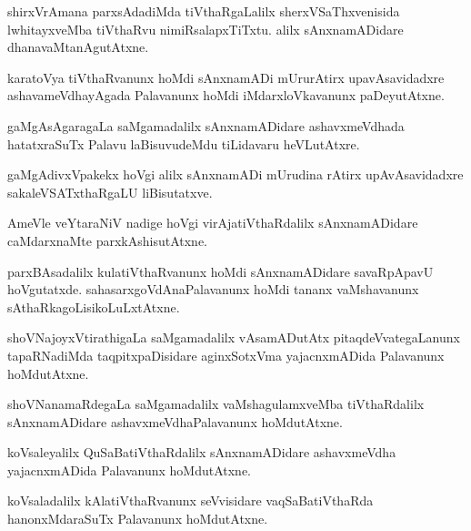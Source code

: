 \documentclass{article}
\begin{document}
\begin{mn}
shirxVrAmana parxsAdadiMda tiVthaRgaLalilx sherxVSaThxvenisida lwhitayxveMba tiVthaRvu 
nimiRsalapxTiTxtu. alilx sAnxnamADidare dhanavaMtanAgutAtxne.
\end{mn}

\begin{mn}
karatoVya tiVthaRvanunx hoMdi sAnxnamADi mUrurAtirx upavAsavidadxre ashavameVdhayAgada Palavanunx 
hoMdi iMdarxloVkavanunx paDeyutAtxne.
\end{mn}

\begin{mn}
gaMgAsAgaragaLa saMgamadalilx sAnxnamADidare ashavxmeVdhada hatatxraSuTx Palavu laBisuvudeMdu 
tiLidavaru heVLutAtxre.
\end{mn}

\begin{mn}
gaMgAdivxVpakekx hoVgi alilx sAnxnamADi mUrudina rAtirx upAvAsavidadxre sakaleVSATxthaRgaLU 
liBisutatxve.
\end{mn}

\begin{mn}
AmeVle veYtaraNiV nadige hoVgi virAjatiVthaRdalilx sAnxnamADidare caMdarxnaMte parxkAshisutAtxne.
\end{mn}

\begin{mn}
parxBAsadalilx kulatiVthaRvanunx hoMdi sAnxnamADidare savaRpApavU hoVgutatxde. 
sahasarxgoVdAnaPalavanunx hoMdi tananx vaMshavanunx sAthaRkagoLisikoLuLxtAtxne.
\end{mn}

\begin{mn}
shoVNajoyxVtirathigaLa saMgamadalilx vAsamADutAtx pitaqdeVvategaLanunx tapaRNadiMda 
taqpitxpaDisidare aginxSotxVma yajacnxmADida Palavanunx hoMdutAtxne.
\end{mn}

\begin{mn}
shoVNanamaRdegaLa saMgamadalilx vaMshagulamxveMba tiVthaRdalilx sAnxnamADidare 
ashavxmeVdhaPalavanunx hoMdutAtxne.
\end{mn}

\begin{mn}
koVsaleyalilx QuSaBatiVthaRdalilx sAnxnamADidare ashavxmeVdha yajacnxmADida Palavanunx hoMdutAtxne.
\end{mn}

\begin{mn}
koVsaladalilx kAlatiVthaRvanunx seVvisidare vaqSaBatiVthaRda hanonxMdaraSuTx Palavanunx hoMdutAtxne.
\end{mn}
\end{document}
